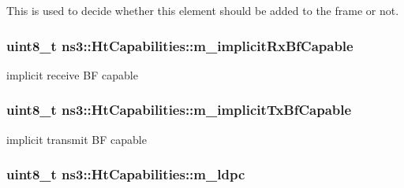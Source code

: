 This is used to decide whether this element should be added to the frame or not. 

\subsubsection[{\texorpdfstring{m\+\_\+implicit\+Rx\+Bf\+Capable}{m_implicitRxBfCapable}}]{\setlength{\rightskip}{0pt plus 5cm}uint8\+\_\+t ns3\+::\+Ht\+Capabilities\+::m\+\_\+implicit\+Rx\+Bf\+Capable\hspace{0.3cm}{\ttfamily [private]}}\hypertarget{classns3_1_1HtCapabilities_aab2257b1ed21afbdf9461f7279d2467c}{}\label{classns3_1_1HtCapabilities_aab2257b1ed21afbdf9461f7279d2467c}


implicit receive BF capable 

\subsubsection[{\texorpdfstring{m\+\_\+implicit\+Tx\+Bf\+Capable}{m_implicitTxBfCapable}}]{\setlength{\rightskip}{0pt plus 5cm}uint8\+\_\+t ns3\+::\+Ht\+Capabilities\+::m\+\_\+implicit\+Tx\+Bf\+Capable\hspace{0.3cm}{\ttfamily [private]}}\hypertarget{classns3_1_1HtCapabilities_a607d92622d4723098cb0f94a1b470660}{}\label{classns3_1_1HtCapabilities_a607d92622d4723098cb0f94a1b470660}


implicit transmit BF capable 

\subsubsection[{\texorpdfstring{m\+\_\+ldpc}{m_ldpc}}]{\setlength{\rightskip}{0pt plus 5cm}uint8\+\_\+t ns3\+::\+Ht\+Capabilities\+::m\+\_\+ldpc\hspace{0.3cm}{\ttfamily [private]}}\hypertarget{classns3_1_1HtCapabilities_abcac69318c2aaef8359d24417f1528bd}{}\label{classns3_1_1HtCapabilities_abcac69318c2aaef8359d24417f1528bd}


